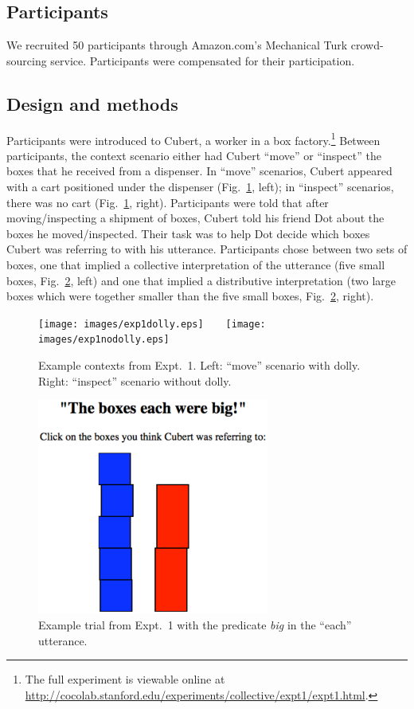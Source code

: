 \documentclass[preprint,12pt,authoryear,titlepage]{elsarticle}
\begin{document}
\subsection{Participants}

We recruited 50 participants through Amazon.com's Mechanical Turk crowd-sourcing service. Participants were compensated for their participation.


\subsection{Design and methods}

Participants were introduced to Cubert, a worker in a box factory.\footnote{The full experiment is viewable online at \url{http://cocolab.stanford.edu/experiments/collective/expt1/expt1.html}.} Between participants, the context scenario either had Cubert ``move'' or ``inspect'' the boxes that he received from a dispenser. In ``move'' scenarios, Cubert appeared with a cart positioned under the dispenser (Fig.~\ref{expt1context}, left); in ``inspect'' scenarios, there was no cart (Fig.~\ref{expt1context}, right). Participants were told that after moving/inspecting a shipment of boxes, Cubert told his friend Dot about the boxes he moved/inspected. Their task was to help Dot decide which boxes Cubert was referring to with his utterance. Participants chose between two sets of boxes, one that implied a collective interpretation of the utterance (five small boxes, Fig.\ \ref{expt1trial}, left) and one that implied a distributive interpretation (two large boxes which were together smaller than the five small boxes, Fig.\ \ref{expt1trial}, right).

\begin{figure}[h]
	\centering
	\texttt{[image: images/exp1dolly.eps]}\ \ \ \ 
	\texttt{[image: images/exp1nodolly.eps]}
	\caption{Example contexts from Expt.~1. Left: ``move'' scenario with dolly. Right: ``inspect'' scenario without dolly.}\label{expt1context}
\end{figure}

\begin{figure}[h]
	\centering
	\includegraphics[width=3in]{images/trial2.eps}
	\caption{Example trial from Expt.~1 with the predicate \emph{big} in the ``each'' utterance.}\label{expt1trial}
\end{figure}
\end{document}
